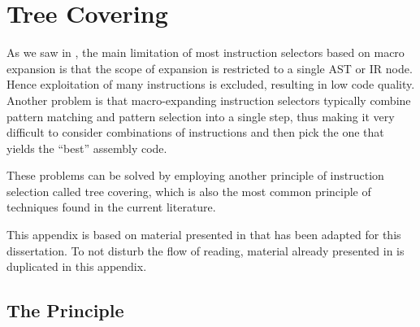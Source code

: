 %

\chapter{Tree Covering}



As we saw in , the main limitation of most
\glspl{instruction selector} based on \gls{macro expansion} is that the scope of
expansion is restricted to a single \gls{AST} or \gls{IR} \gls{node}.
%
Hence exploitation of many \glspl{instruction} is excluded, resulting in low
code quality.
%
Another problem is that \gls{macro}-expanding \glspl{instruction selector}
typically combine \gls{pattern matching} and \gls{pattern selection} into a
single step, thus making it very difficult to consider combinations of
\glspl{instruction} and then pick the one that yields the ``best'' \gls{assembly
  code}.

These problems can be solved by employing another \gls{principle} of
\gls{instruction selection} called \gls{tree covering}, which is also the most
common \gls{principle} of techniques found in the current literature.

This appendix is based on material presented in
\cite[Chap.]{HjortBlindell:2016:Survey} that has been adapted for
this dissertation.
%
To not disturb the flow of reading, material already presented in
 is duplicated in this appendix.


\section{The Principle}


